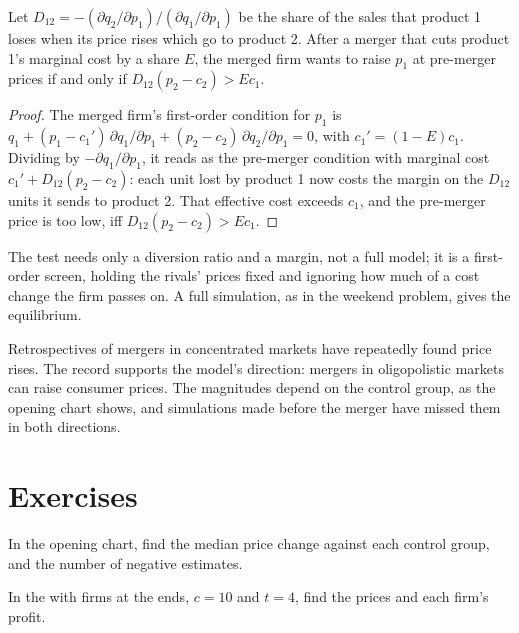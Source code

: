\begin{proposition}\label{prop:b3:oligopoly-and-collusion:upp}
Let $D_{12} = -(\partial q_2/\partial p_1)/(\partial q_1/\partial p_1)$ be the share of the sales that product 1 loses when its price
rises which go to product 2. After a merger that cuts product 1's marginal cost by a share $E$, the merged firm wants
to raise $p_1$ at pre-merger prices if and only if $D_{12}(p_2 - c_2) > Ec_1$.
\end{proposition}

\begin{proof}
The merged firm's first-order condition for $p_1$ is $q_1 + (p_1 - c_1')\,\partial q_1/\partial p_1 + (p_2 - c_2)\,\partial q_2/\partial p_1 = 0$, with
$c_1' = (1 - E)c_1$. Dividing by $-\partial q_1/\partial p_1$, it reads as the pre-merger condition with marginal cost
$c_1' + D_{12}(p_2 - c_2)$: each unit lost by product 1 now costs the margin on the $D_{12}$ units it sends to
product 2. That effective cost exceeds $c_1$, and the pre-merger price is too low, iff
$D_{12}(p_2 - c_2) > Ec_1$.
\end{proof}

The test needs only a diversion ratio and a margin, not a full model; it is a
first-order screen, holding the rivals' prices fixed and ignoring how much of a cost
change the firm passes on. A full simulation, as in the weekend problem, gives the
equilibrium.

Retrospectives of mergers in concentrated markets have repeatedly found price rises.
The record supports the model's direction: mergers in oligopolistic markets can raise
consumer prices. The magnitudes depend on the control group, as the opening chart
shows, and simulations made before the merger have missed them in both directions.

\section{Exercises}\label{sec:b3:oligopoly-and-collusion:exercises}

\begin{exercise}[$\star$]\label{exo:b3:oligopoly-and-collusion:1}
In the opening chart, find the median price change against each control group, and
the number of negative estimates.
\end{exercise}

\begin{exercise}[$\star$]\label{exo:b3:oligopoly-and-collusion:2}
In the  with firms at the ends, $c = 10$ and $t = 4$, find the prices and each firm's
profit.
\end{exercise}

